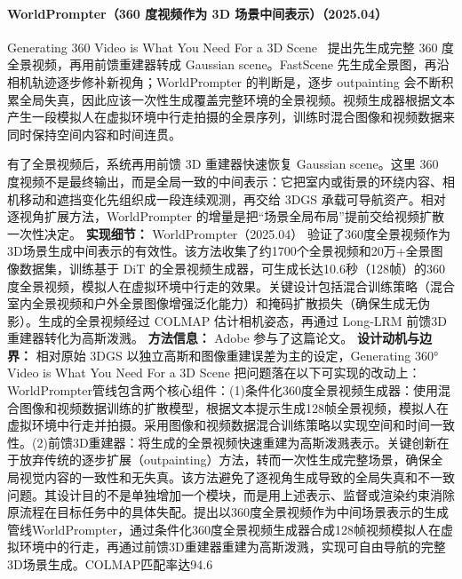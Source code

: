 \paragraph{WorldPrompter（360 度视频作为 3D 场景中间表示）（2025.04）}
Generating 360 Video is What You Need For a 3D Scene~\cite{2504_02045} 提出先生成完整 360 度全景视频，再用前馈重建器转成 Gaussian scene。FastScene 先生成全景图，再沿相机轨迹逐步修补新视角；WorldPrompter 的判断是，逐步 outpainting 会不断积累全局失真，因此应该一次性生成覆盖完整环境的全景视频。视频生成器根据文本产生一段模拟人在虚拟环境中行走拍摄的全景序列，训练时混合图像和视频数据来同时保持空间内容和时间连贯。

有了全景视频后，系统再用前馈 3D 重建器快速恢复 Gaussian scene。这里 360 度视频不是最终输出，而是全局一致的中间表示：它把室内或街景的环绕内容、相机移动和遮挡变化先组织成一段连续观测，再交给 3DGS 承载可导航资产。相对逐视角扩展方法，WorldPrompter 的增量是把“场景全局布局”提前交给视频扩散一次性决定。
\textbf{实现细节：} WorldPrompter（2025.04） 验证了360度全景视频作为3D场景生成中间表示的有效性。该方法收集了约1700个全景视频和20万+全景图像数据集，训练基于 DiT 的全景视频生成器，可生成长达10.6秒（128帧）的360度全景视频，模拟人在虚拟环境中行走的效果。关键设计包括混合训练策略（混合室内全景视频和户外全景图像增强泛化能力）和掩码扩散损失（确保生成无伪影）。生成的全景视频经过 COLMAP 估计相机姿态，再通过 Long-LRM 前馈3D重建器转化为高斯泼溅。
\textbf{方法信息：} Adobe 参与了这篇论文。
\textbf{设计动机与边界：} 相对原始 3DGS 以独立高斯和图像重建误差为主的设定，Generating 360° Video is What You Need For a 3D Scene 把问题落在以下可实现的改动上：WorldPrompter管线包含两个核心组件：(1)条件化360度全景视频生成器：使用混合图像和视频数据训练的扩散模型，根据文本提示生成128帧全景视频，模拟人在虚拟环境中行走并拍摄。采用图像和视频数据混合训练策略以实现空间和时间一致性。(2)前馈3D重建器：将生成的全景视频快速重建为高斯泼溅表示。关键创新在于放弃传统的逐步扩展（outpainting）方法，转而一次性生成完整场景，确保全局视觉内容的一致性和无失真。该方法避免了逐视角生成导致的全局失真和不一致问题。其设计目的不是单独增加一个模块，而是用上述表示、监督或渲染约束消除原流程在目标任务中的具体失配。提出以360度全景视频作为中间场景表示的生成管线WorldPrompter，通过条件化360度全景视频生成器合成128帧视频模拟人在虚拟环境中的行走，再通过前馈3D重建器重建为高斯泼溅，实现可自由导航的完整3D场景生成。COLMAP匹配率达94.6%
